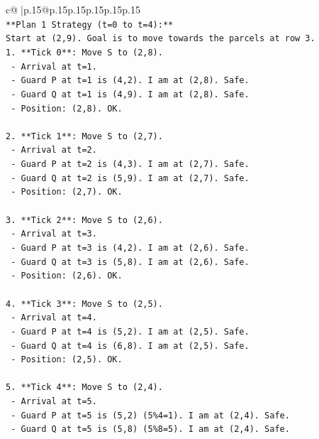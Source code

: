 \documentclass{article}
\begin{document}
{\begin{supertabular}{c@{$\;$}|p{.15\linewidth}@{}p{.15\linewidth}p{.15\linewidth}p{.15\linewidth}p{.15\linewidth}p{.15\linewidth}}
{{{\\ 
\texttt{**Plan 1 Strategy (t=0 to t=4):**} \\
\texttt{Start at (2,9). Goal is to move towards the parcels at row 3.} \\
\texttt{1. **Tick 0**: Move S to (2,8).} \\
\texttt{   {-} Arrival at t=1.} \\
\texttt{   {-} Guard P at t=1 is (4,2). I am at (2,8). Safe.} \\
\texttt{   {-} Guard Q at t=1 is (4,9). I am at (2,8). Safe.} \\
\texttt{   {-} Position: (2,8). OK.} \\
\\ 
\texttt{2. **Tick 1**: Move S to (2,7).} \\
\texttt{   {-} Arrival at t=2.} \\
\texttt{   {-} Guard P at t=2 is (4,3). I am at (2,7). Safe.} \\
\texttt{   {-} Guard Q at t=2 is (5,9). I am at (2,7). Safe.} \\
\texttt{   {-} Position: (2,7). OK.} \\
\\ 
\texttt{3. **Tick 2**: Move S to (2,6).} \\
\texttt{   {-} Arrival at t=3.} \\
\texttt{   {-} Guard P at t=3 is (4,2). I am at (2,6). Safe.} \\
\texttt{   {-} Guard Q at t=3 is (5,8). I am at (2,6). Safe.} \\
\texttt{   {-} Position: (2,6). OK.} \\
\\ 
\texttt{4. **Tick 3**: Move S to (2,5).} \\
\texttt{   {-} Arrival at t=4.} \\
\texttt{   {-} Guard P at t=4 is (5,2). I am at (2,5). Safe.} \\
\texttt{   {-} Guard Q at t=4 is (6,8). I am at (2,5). Safe.} \\
\texttt{   {-} Position: (2,5). OK.} \\
\\ 
\texttt{5. **Tick 4**: Move S to (2,4).} \\
\texttt{   {-} Arrival at t=5.} \\
\texttt{   {-} Guard P at t=5 is (5,2) (5\%4=1). I am at (2,4). Safe.} \\
\texttt{   {-} Guard Q at t=5 is (5,8) (5\%8=5). I am at (2,4). Safe.} \\
}}}
\end{supertabular}}
\end{document}
